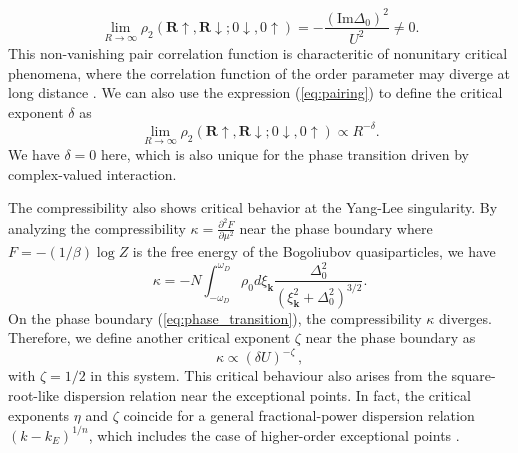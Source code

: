 \documentclass[aps,prl,twocolumn,nofootinbib,superscriptaddress,notitlepage,longbibliography]{revtex4-1}
\begin{document}
	\begin{equation}
	\lim_{R\rightarrow\infty}\rho_{2}(\bm{R}\uparrow,\bm{R}\downarrow;0\downarrow,0\uparrow)=-\frac{(\text{Im}\Delta_{0})^{2}}{U^{2}}\neq0.\label{eq:pairing}
	\end{equation}
	This non-vanishing pair correlation function is characteritic of nonunitary critical phenomena, where the correlation function of the order parameter may diverge at long distance \cite{Fisher:1978vn}. We can also use the expression (\ref{eq:pairing}) to define the critical exponent $\delta$ as
	\begin{equation}
		\lim_{R\rightarrow\infty}\rho_{2}(\bm{R}\uparrow,\bm{R}\downarrow;0\downarrow,0\uparrow)\propto R^{-\delta}.
	\end{equation}
	We have $\delta=0$ here, which is also unique for the phase transition driven by complex-valued interaction.
	
	The compressibility also shows critical behavior at the Yang-Lee singularity. By analyzing the compressibility $\kappa=\frac{\partial^2 F}{\partial \mu^2}$ near the phase boundary where $F=-(1/\beta)\log Z$ is the free energy of the Bogoliubov quasiparticles, we have 
	\begin{equation}
		 \kappa=- N\int_{- \omega_D}^{\omega_D} \rho_0 d\xi_{\bm{k}} \frac{\Delta_0^2}{(\xi_{\bm{k}}^2 + \Delta_0^2)^{3/ 2}}.
	\end{equation}
	On the phase boundary (\ref{eq:phase_transition}), the compressibility $\kappa$ diverges. Therefore, we define another critical exponent $\zeta$ near the phase boundary as
	\begin{equation}
		\kappa\propto(\delta U)^{-\zeta}\,,
	\end{equation}
	with $\zeta=1/2$ in this system. This critical behaviour also arises from the square-root-like dispersion relation near the exceptional points. %
	In fact, the critical exponents $\eta$ and $\zeta$ coincide for a general fractional-power dispersion relation $(k-k_E)^{1/n}$, which includes the case of higher-order exceptional points \cite{SupplementaryMaterial}.
\end{document}
